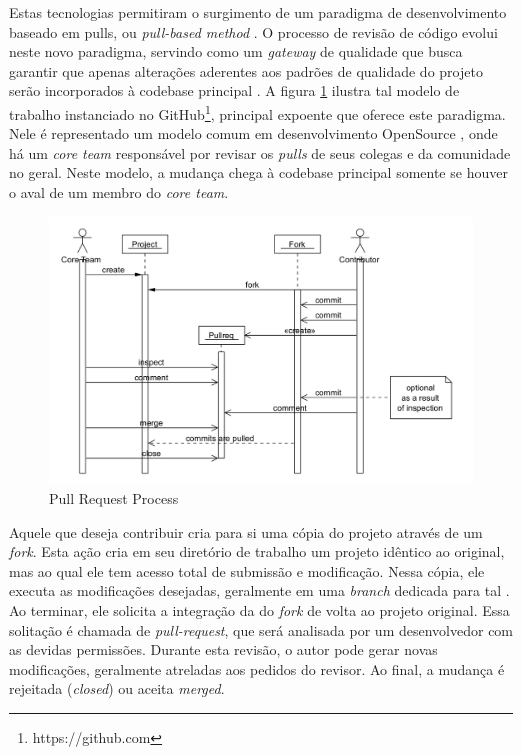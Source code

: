 \documentclass[12pt,openany,oneside,a4paper,english,brazil]{abntbibufjf}
\begin{document}
    Estas tecnologias permitiram o surgimento de um paradigma de desenvolvimento baseado em pulls, ou \textit{pull-based method} \cite{gousios2014}. O processo de revisão de código evolui neste novo paradigma, servindo como um \textit{gateway} de qualidade que busca garantir que apenas alterações aderentes aos padrões de qualidade do projeto serão incorporados à codebase principal \cite{gousios2015}. A figura \ref{fig:pull-request-flow} ilustra tal modelo de trabalho instanciado no GitHub\footnote{https://github.com}, principal expoente que oferece este paradigma. Nele é representado um modelo comum em desenvolvimento OpenSource \cite{6385140}, onde há um \textit{core team} responsável por revisar os \textit{pulls} de seus colegas e da comunidade no geral. Neste modelo, a mudança chega à codebase principal somente se houver o aval de um membro do \textit{core team}.

     \begin{figure}[!htbp]
      \includegraphics[width=\textwidth]{pull-request-flow}
      \caption{Pull Request Process \cite{gousios2014}}\label{fig:pull-request-flow}
    \end{figure}

    Aquele que deseja contribuir cria para si uma cópia do projeto através de um \textit{fork}. Esta ação cria em seu diretório de trabalho um projeto idêntico ao original, mas ao qual ele tem acesso total de submissão e modificação. Nessa cópia, ele executa as modificações desejadas, geralmente em uma \textit{branch} dedicada para tal \cite{gousios2016}. Ao terminar, ele solicita a integração da  do \textit{fork} de volta ao projeto original. Essa solitação é chamada de \textit{pull-request}, que será analisada por um desenvolvedor com as devidas permissões. Durante esta revisão, o autor pode gerar novas modificações, geralmente atreladas aos pedidos do revisor. Ao final, a mudança é rejeitada (\textit{closed}) ou aceita \textit{merged}.
\end{document}
